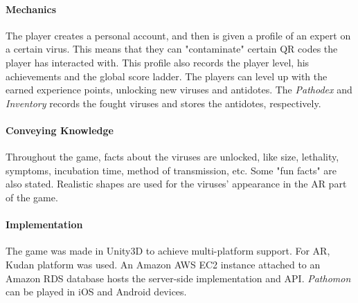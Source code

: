 \documentclass[runningheads]{llncs}
\begin{document}
\paragraph{Mechanics} The player creates a personal account, and then is given a profile of an expert on a certain virus. This means that they can "contaminate" certain QR codes the player has interacted with. This profile also records the player level, his achievements and the global score ladder. The players can level up with the earned experience points, unlocking new viruses and antidotes. The \textit{Pathodex} and \textit{Inventory} records the fought viruses and stores the antidotes, respectively.

\paragraph{Conveying Knowledge} Throughout the game, facts about the viruses are unlocked, like size, lethality, symptoms, incubation time, method of transmission, etc. Some "fun facts" are also stated. Realistic shapes are used for the viruses' appearance in the AR part of the game.

\paragraph{Implementation} The game was made in Unity3D to achieve multi-platform support. For AR, Kudan platform was used. An Amazon AWS EC2 instance attached to an Amazon RDS database hosts the server-side implementation and API. \textit{Pathomon} can be played in iOS and Android devices.
\end{document}
